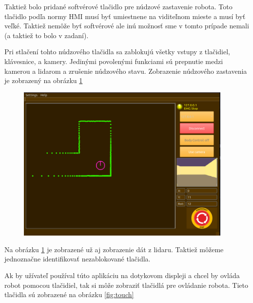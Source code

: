 Taktiež bolo pridané softvérové tlačidlo pre núdzové zastavenie robota. Toto tlačidlo podľa normy HMI musí byť
umiestnene na viditeľnom mieste a musí byť veľké. Taktiež nemôže byť softvérové ale inú možnosť sme v tomto prípade
nemali (a taktiež to bolo v zadaní).

Pri stlačení tohto núdzového tlačidla sa zablokujú všetky vstupy z tlačidiel, klávesnice, a kamery. Jedinými
povolenými funkciami sú prepnutie medzi kamerou a lidarom a zrušenie núdzového stavu. Zobrazenie núdzového zastavenia
je zobrazený na obrázku \ref{fig:emergency}

\begin{figure}[!htbp]
	\begin{center}
		\includegraphics[width=0.95\textwidth]{img/app-emg-stop.png}
	\end{center}
	\caption{}\label{fig:emergency}
\end{figure}

Na obrázku \ref{fig:emergency} je zobrazené už aj zobrazenie dát z lidaru. Taktiež môžeme jednoznačne identifikovať
nezablokované tlačidla.

Ak by užívateľ používal túto aplikáciu na dotykovom displeji a chcel by ovláda robot pomocou tlačidiel, tak si môže
zobraziť tlačidlá pre ovládanie robota. Tieto tlačidla sú zobrazené na obrázku \ref{fig:touch}

